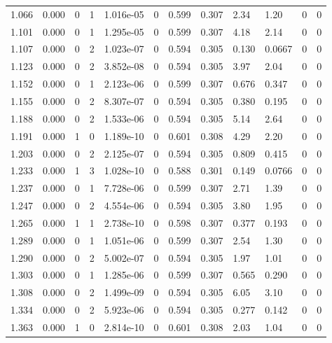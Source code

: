 \documentclass[preview]{standalone}
\begin{document}
{{{\begin{tabular}{L{1.2cm}C{1.2cm} C{0.3cm}C{0.5cm} C{1.4cm}C{1.4cm} C{1.4cm}C{1.4cm} C{1.6cm}C{1.6cm} C{1.6cm}C{1.6cm}}
  1.066  &  0.000  & 0     &  1 &  1.016e-05  & 0  &  0.599&   0.307& 2.34 & 1.20   &  0 & 0  \\ 
  1.101  &  0.000  & 0     &  1 &  1.295e-05  & 0  &  0.599&   0.307& 4.18 & 2.14   &  0 & 0  \\ 
  1.107  &  0.000  & 0     &  2 &  1.023e-07  & 0  &  0.594&   0.305& 0.130 & 0.0667   &  0 & 0  \\ 
  1.123  &  0.000  & 0     &  2 &  3.852e-08  & 0  &  0.594&   0.305& 3.97 & 2.04   &  0 & 0  \\ 
  1.152  &  0.000  & 0     &  1 &  2.123e-06  & 0  &  0.599&   0.307& 0.676 & 0.347   &  0 & 0  \\ 
  1.155  &  0.000  & 0     &  2 &  8.307e-07  & 0  &  0.594&   0.305& 0.380 & 0.195   &  0 & 0  \\ 
  1.188  &  0.000  & 0     &  2 &  1.533e-06  & 0  &  0.594&   0.305& 5.14 & 2.64   &  0 & 0  \\ 
  1.191  &  0.000  & 1     &  0 &  1.189e-10  & 0  &  0.601&   0.308& 4.29 & 2.20   &  0 & 0  \\ 
  1.203  &  0.000  & 0     &  2 &  2.125e-07  & 0  &  0.594&   0.305& 0.809 & 0.415   &  0 & 0  \\ 
  1.233  &  0.000  & 1     &  3 &  1.028e-10  & 0  &  0.588&   0.301& 0.149 & 0.0766   &  0 & 0  \\ 
  1.237  &  0.000  & 0     &  1 &  7.728e-06  & 0  &  0.599&   0.307& 2.71 & 1.39   &  0 & 0  \\ 
  1.247  &  0.000  & 0     &  2 &  4.554e-06  & 0  &  0.594&   0.305& 3.80 & 1.95   &  0 & 0  \\ 
  1.265  &  0.000  & 1     &  1 &  2.738e-10  & 0  &  0.598&   0.307& 0.377 & 0.193   &  0 & 0  \\ 
  1.289  &  0.000  & 0     &  1 &  1.051e-06  & 0  &  0.599&   0.307& 2.54 & 1.30   &  0 & 0  \\ 
  1.290  &  0.000  & 0     &  2 &  5.002e-07  & 0  &  0.594&   0.305& 1.97 & 1.01   &  0 & 0  \\ 
  1.303  &  0.000  & 0     &  1 &  1.285e-06  & 0  &  0.599&   0.307& 0.565 & 0.290   &  0 & 0  \\ 
  1.308  &  0.000  & 0     &  2 &  1.499e-09  & 0  &  0.594&   0.305& 6.05 & 3.10   &  0 & 0  \\ 
  1.334  &  0.000  & 0     &  2 &  5.923e-06  & 0  &  0.594&   0.305& 0.277 & 0.142   &  0 & 0  \\ 
  1.363  &  0.000  & 1     &  0 &  2.814e-10  & 0  &  0.601&   0.308& 2.03 & 1.04   &  0 & 0  \\ 

\end{tabular}}}}
\end{document}
